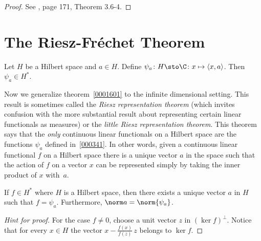 \begin{proof}  See \cite{Kreyszig:1978}, page 171, Theorem 3.6-4.   \ns
\end{proof}





















\section{The Riesz-Fr\'echet Theorem}
\begin{exam}\label{000341} Let $H$ be a Hilbert space and $a \in H$.  Define $\psi_a\colon
H \sto \C\colon x \mapsto \langle x,a \rangle$.  Then $\psi_a \in H^*$.
\end{exam}

Now we generalize theorem~\ref{0001601} to the infinite dimensional setting. This result
is sometimes called the \emph{Riesz representation theorem} (which invites confusion with
the more substantial result about representing  certain linear functionals as measures)
or the \emph{little Riesz representation theorem}.  This theorem says that the \emph{only}
continuous linear functionals on a Hilbert space are the functions $\psi_a$ defined in~\ref{000341}.
In other words, given a continuous linear functional $f$ on a Hilbert space there is a unique vector
$a$ in the space such that the action of $f$ on a vector $x$ can be represented simply by taking the
inner product of $x$ with~$a$.

\begin{thm}\label{000342} If $f \in H^*$ where $H$ is a Hilbert
space, then there exists a unique vector $a$ in $H$ such that $f = \psi_a$. Furthermore,
$\norm a = \norm{\psi_a}$.
\end{thm}

\begin{proof}[\emph{Hint for proof}] For the case $f \ne 0$, choose a unit vector $z$ in $(\ker f)^\perp$.
Notice that for every $x \in H$ the vector $x - \frac{f(x)}{f(z)}\,z$ belongs to $\ker f$.  \ns
\end{proof}

